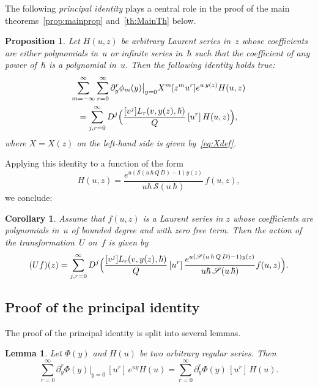 \documentclass[JEP,XML,SOM,Unicode,NoEqCountersInSection,NoFloatCountersInSection]{cedram}
\let\mathcal\mathscr
\theoremstyle{plain}
\newtheorem{proposition}[theorem]{Proposition}
\newtheorem{corollary}[theorem]{Corollary}
\newtheorem{lemma}[theorem]{Lemma}
\theoremstyle{definition}
\theoremstyle{remark}
\newcommand{\cS}{\mathcal{S}}
\begin{document}
The following \emph{principal identity} plays a central role in the proof of the main theorems~\ref{prop:mainprop} and~\ref{th:MainTh} below.
\begin{proposition}\label{prop:principal}
Let $H(u,z)$ be arbitrary Laurent series in~$z$ whose coefficients are either polynomials in~$u$ or infinite series in~$\hbar$ such that the coefficient of any power of~$\hbar$ is a polynomial in~$u$. Then the following identity holds true:
\begin{multline}\label{eq:princid}
\sum_{m=-\infty}^\infty \sum_{r=0}^\infty \partial_y^{r}\phi_{m}(y)\big|_{y=0}
X^m[z^m u^r]e^{u\,y(z)}H(u,z)\\
=\sum_{j,r=0}^\infty D^j\Bigl(\frac{[v^j]L_r(v,y(z),\hbar)}{Q}\,[u^r]\, H(u,z)\Bigr),
\end{multline}
where $X=X(z)$ on the left-hand side is given by~\eqref{eq:Xdef}.
\end{proposition}

Applying this identity to a function of the form
\[
H(u,z)=\frac{e^{u(\cS(u\,\hbar\,Q\,D)-1)y(z)}}{u\hbar\,\cS(u\,\hbar)}\,f(u,z),
\]
we conclude:

\begin{corollary}\label{cor:principal}
Assume that $f(u,z)$ is a Laurent series in $z$ whose coefficients are polynomials in~$u$ of bounded degree and with zero free term. Then the action of the transformation~$U$ on~$f$ is given by
\begin{equation}\label{eq:principal}
(U f)(z)=\sum_{j,r=0}^\infty D^j\Bigl(\frac{[v^j]L_r(v,y(z),\hbar)}{Q}\,[u^r]\, \frac{e^{u(\cS(u\,\hbar\,Q\,D)-1)y(z)}}{u\hbar\,\cS(u\,\hbar)}f(u,z)\Bigr).
\end{equation}
\end{corollary}

\subsection{Proof of the principal identity}
The proof of the principal identity is split into several lemmas.

\begin{lemma}\label{lem:L1}
Let $\Phi(y)$ and $H(u)$ be two arbitrary regular series. Then
\begin{equation}\label{eq:L1}
\sum_{r=0}^\infty \partial_y^r\Phi(y)\big|_{y=0} \,[u^r]\,e^{u y}H(u)=
\sum_{r=0}^\infty \partial_y^r\Phi(y) \,[u^r]\, H(u).
\end{equation}
\end{lemma}
\end{document}
